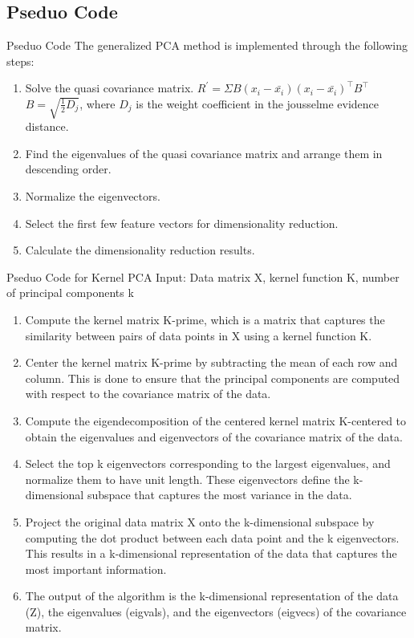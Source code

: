 \documentclass{beamer}
\begin{document}
\subsection{Pseduo Code}
\begin{frame}{Pseduo Code}
    The generalized PCA method is implemented through the following steps:
    \begin{enumerate}
    \item Solve the quasi covariance matrix. \newline
    $R^\prime = \Sigma B(x_i - \bar{x_i})(x_i - \bar{x_i})^\top B^\top$\\
    $B = \sqrt{\frac{1}{2}D_j}$, where $D_j$ is the weight coefficient in the jousselme evidence distance.
    \item Find the eigenvalues of the quasi covariance matrix and arrange them in descending order.
    \item Normalize the eigenvectors.
    \item Select the first few feature vectors for dimensionality reduction.
    \item Calculate the dimensionality reduction results.
    \end{enumerate}
\end{frame}

\begin{frame}[allowframebreaks]{Pseduo Code for Kernel PCA}
    Input: Data matrix X, kernel function K, \newline number of principal components k
    \begin{enumerate}
    \item Compute the kernel matrix K-prime, which is a matrix that captures the similarity between pairs of data points in X using a kernel function K.
    \item Center the kernel matrix K-prime by subtracting the mean of each row and column. This is done to ensure that the principal components are computed with respect to the covariance matrix of the data.
    \item Compute the eigendecomposition of the centered kernel matrix K-centered to obtain the eigenvalues and eigenvectors of the covariance matrix of the data.
    \item Select the top k eigenvectors corresponding to the largest eigenvalues, and normalize them to have unit length. These eigenvectors define the k-dimensional subspace that captures the most variance in the data.
    \item Project the original data matrix X onto the k-dimensional subspace by computing the dot product between each data point and the k eigenvectors. This results in a k-dimensional representation of the data that captures the most important information.
    \item The output of the algorithm is the k-dimensional representation of the data (Z), the eigenvalues (eigvals), and the eigenvectors (eigvecs) of the covariance matrix.
    \end{enumerate}
\end{frame}
\end{document}
